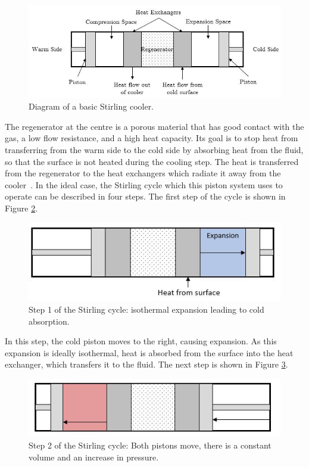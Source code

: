\begin{figure}
\centering
  \includegraphics[width=\linewidth]{chap2_images/stirling_cooler.JPG}
  \caption{Diagram of a basic Stirling cooler.}
  \label{fig:stirling_cooler}
\end{figure}

The regenerator at the centre is a porous material that has good contact with the gas, a low flow resistance, and a high heat capacity. Its goal is to stop heat from transferring from the warm side to the cold side by absorbing heat from the fluid, so that the surface is not heated during the cooling step. The heat is transferred from the regenerator to the heat exchangers which radiate it away from the cooler~\citep{cryocoolers}.  In the ideal case, the Stirling cycle which this piston system uses to operate can be described in four steps. The first step of the cycle is shown in Figure \ref{fig:stirling_cycle_part_1}.

\begin{figure}[h]
\centering
  \includegraphics[width=0.8\linewidth]{chap2_images/stirling_process_cold_absorb.JPG}
  \caption{Step 1 of the Stirling cycle: isothermal expansion leading to cold absorption.}
  \label{fig:stirling_cycle_part_1}
\end{figure}

In this step, the cold piston moves to the right, causing expansion. As this expansion is ideally isothermal, heat is absorbed from the surface into the heat exchanger, which transfers it to the fluid. The next step is shown in Figure \ref{fig:stirling_cycle_part_2}.

\begin{figure}[h]
\centering
  \includegraphics[width=0.8\linewidth]{chap2_images/stirling_process_cold_transfer.JPG}
  \caption{Step 2 of the Stirling cycle: Both pistons move, there is a constant volume and an increase in pressure.}
  \label{fig:stirling_cycle_part_2}
\end{figure}

